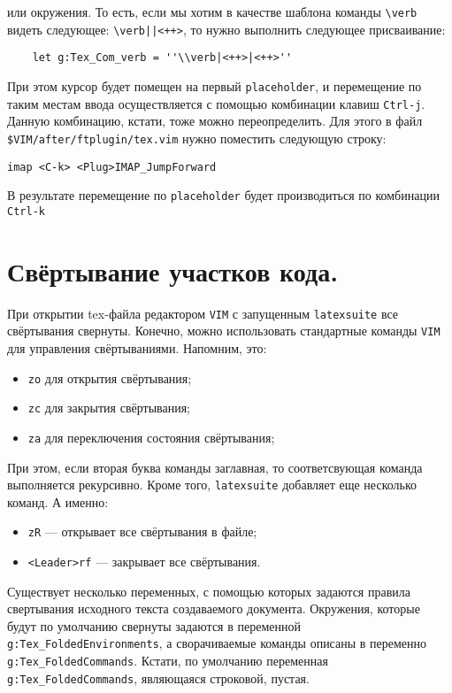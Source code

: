 \documentclass[a4paper]{article}
\begin{document}
или окружения. То есть, если мы хотим в качестве шаблона команды \verb|\verb| 
видеть следующее: \verb$\verb||<++>$, то нужно выполнить следующее присваивание:
\begin{verbatim}
	let g:Tex_Com_verb = ''\\verb|<++>|<++>''
\end{verbatim}
При этом курсор будет помещен на первый \texttt{placeholder}, и перемещение по таким 
местам ввода осуществляется с помощью комбинации клавиш \texttt{Ctrl-j}. Данную комбинацию,
кстати, тоже можно переопределить. Для этого в файл \verb|$VIM/after/ftplugin/tex.vim| 
нужно поместить следующую строку:
\begin{verbatim}
imap <C-k> <Plug>IMAP_JumpForward
\end{verbatim}
В результате перемещение по \texttt{placeholder} будет производиться по комбинации \texttt{Ctrl-k}
\part{Свёртывание участков кода.}
			При открытии tex-файла редактором \texttt{VIM} с запущенным \texttt{latexsuite}
			все свёртывания свернуты. Конечно, можно использовать стандартные команды \texttt{VIM}
			для управления свёртываниями. Напомним, это:
			\begin{itemize}
			  \item \texttt{zo} для открытия свёртывания;
			  \item \texttt{zc} для закрытия свёртывания;
			  \item \texttt{za} для переключения состояния свёртывания;
			\end{itemize}
			При этом, если вторая буква команды заглавная, то соответсвующая команда выполняется 
			рекурсивно. 
			Кроме того, \texttt{latexsuite} добавляет еще несколько команд. А именно:
			\begin{itemize}
			  \item \texttt{zR} --- открывает все свёртывания в файле;
			  \item \texttt{<Leader>rf} --- закрывает все свёртывания.
			\end{itemize}

Существует  несколько переменных, с помощью которых задаются правила свертывания исходного текста
создаваемого документа. Окружения, которые будут по умолчанию свернуты задаются в переменной
\verb|g:Tex_FoldedEnvironments|, а сворачиваемые команды описаны в переменно \verb|g:Tex_FoldedCommands|.
Кстати, по умолчанию переменная \verb|g:Tex_FoldedCommands|, являющаяся строковой, пустая.
\end{document}
